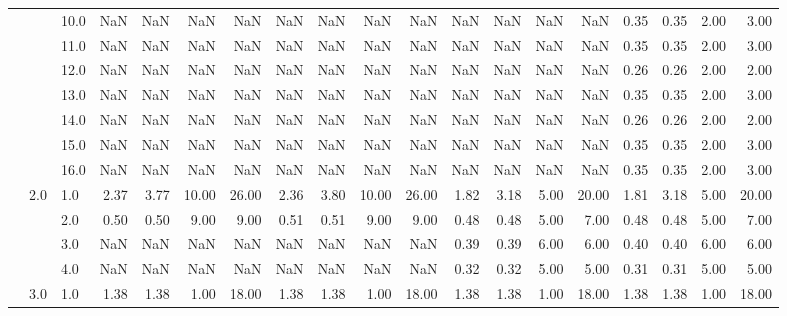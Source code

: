 \begin{tabular}{lllrrrrrrrrrrrrrrrr}
     &     & 10.0 &        NaN &       NaN &   NaN &    NaN &        NaN &       NaN &   NaN &    NaN &        NaN &       NaN &   NaN &    NaN &       0.35 &      0.35 & 2.00 &   3.00 \\
     &     & 11.0 &        NaN &       NaN &   NaN &    NaN &        NaN &       NaN &   NaN &    NaN &        NaN &       NaN &   NaN &    NaN &       0.35 &      0.35 & 2.00 &   3.00 \\
     &     & 12.0 &        NaN &       NaN &   NaN &    NaN &        NaN &       NaN &   NaN &    NaN &        NaN &       NaN &   NaN &    NaN &       0.26 &      0.26 & 2.00 &   2.00 \\
     &     & 13.0 &        NaN &       NaN &   NaN &    NaN &        NaN &       NaN &   NaN &    NaN &        NaN &       NaN &   NaN &    NaN &       0.35 &      0.35 & 2.00 &   3.00 \\
     &     & 14.0 &        NaN &       NaN &   NaN &    NaN &        NaN &       NaN &   NaN &    NaN &        NaN &       NaN &   NaN &    NaN &       0.26 &      0.26 & 2.00 &   2.00 \\
     &     & 15.0 &        NaN &       NaN &   NaN &    NaN &        NaN &       NaN &   NaN &    NaN &        NaN &       NaN &   NaN &    NaN &       0.35 &      0.35 & 2.00 &   3.00 \\
     &     & 16.0 &        NaN &       NaN &   NaN &    NaN &        NaN &       NaN &   NaN &    NaN &        NaN &       NaN &   NaN &    NaN &       0.35 &      0.35 & 2.00 &   3.00 \\
     & 2.0 & 1.0  &       2.37 &      3.77 & 10.00 &  26.00 &       2.36 &      3.80 & 10.00 &  26.00 &       1.82 &      3.18 &  5.00 &  20.00 &       1.81 &      3.18 & 5.00 &  20.00 \\
     &     & 2.0  &       0.50 &      0.50 &  9.00 &   9.00 &       0.51 &      0.51 &  9.00 &   9.00 &       0.48 &      0.48 &  5.00 &   7.00 &       0.48 &      0.48 & 5.00 &   7.00 \\
     &     & 3.0  &        NaN &       NaN &   NaN &    NaN &        NaN &       NaN &   NaN &    NaN &       0.39 &      0.39 &  6.00 &   6.00 &       0.40 &      0.40 & 6.00 &   6.00 \\
     &     & 4.0  &        NaN &       NaN &   NaN &    NaN &        NaN &       NaN &   NaN &    NaN &       0.32 &      0.32 &  5.00 &   5.00 &       0.31 &      0.31 & 5.00 &   5.00 \\
     & 3.0 & 1.0  &       1.38 &      1.38 &  1.00 &  18.00 &       1.38 &      1.38 &  1.00 &  18.00 &       1.38 &      1.38 &  1.00 &  18.00 &       1.38 &      1.38 & 1.00 &  18.00 \\

\end{tabular}
